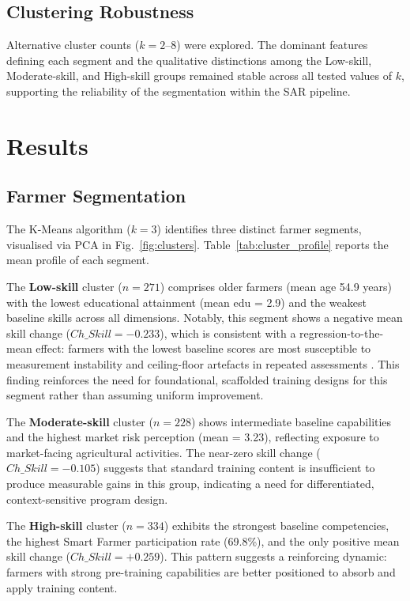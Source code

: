 \documentclass[3p,twocolumn,authoryear]{elsarticle}
\begin{document}
\subsection{Clustering Robustness}

Alternative cluster counts ($k = 2$--$8$) were explored.
The dominant features defining each segment and the qualitative
distinctions among the Low-skill, Moderate-skill, and High-skill
groups remained stable across all tested values of $k$,
supporting the reliability of the segmentation within the
SAR pipeline.

\section{Results}

\subsection{Farmer Segmentation}

The K-Means algorithm ($k = 3$) identifies three distinct
farmer segments, visualised via PCA in
Fig.~\ref{fig:clusters}.
Table~\ref{tab:cluster_profile} reports the mean profile
of each segment.

The \textbf{Low-skill} cluster ($n = 271$) comprises older
farmers (mean age 54.9 years) with the lowest educational
attainment (mean edu = 2.9) and the weakest baseline skills
across all dimensions.
Notably, this segment shows a negative mean skill change
($Ch\_Skill = -0.233$), which is consistent with a
regression-to-the-mean effect: farmers with the lowest
baseline scores are most susceptible to measurement
instability and ceiling-floor artefacts in repeated
assessments \citep{davis2012}.
This finding reinforces the need for foundational, scaffolded
training designs for this segment rather than assuming uniform
improvement.

The \textbf{Moderate-skill} cluster ($n = 228$) shows
intermediate baseline capabilities and the highest market
risk perception (mean = 3.23), reflecting exposure to
market-facing agricultural activities.
The near-zero skill change ($Ch\_Skill = -0.105$) suggests
that standard training content is insufficient to produce
measurable gains in this group, indicating a need for
differentiated, context-sensitive program design.

The \textbf{High-skill} cluster ($n = 334$) exhibits
the strongest baseline competencies, the highest Smart
Farmer participation rate (69.8\%), and the only positive
mean skill change ($Ch\_Skill = +0.259$).
This pattern suggests a reinforcing dynamic: farmers with
strong pre-training capabilities are better positioned to
absorb and apply training content.
\end{document}
